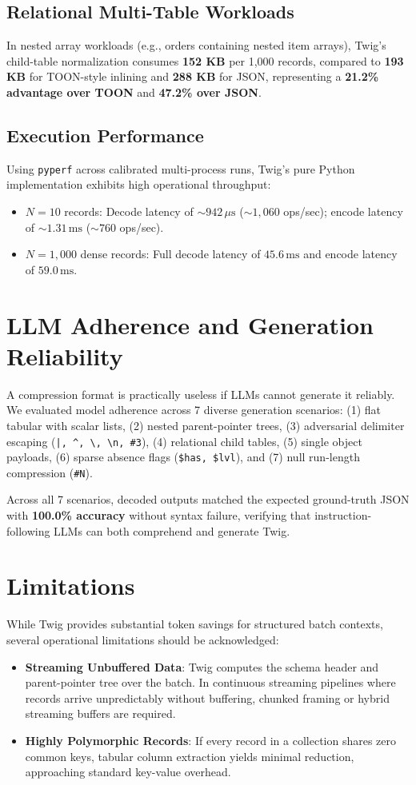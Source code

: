 \documentclass[11pt,a4paper]{article}
\begin{document}
\subsection{Relational Multi-Table Workloads}
In nested array workloads (e.g., orders containing nested item arrays), Twig's child-table normalization consumes \textbf{152 KB} per 1,000 records, compared to \textbf{193 KB} for TOON-style inlining and \textbf{288 KB} for JSON, representing a \textbf{21.2\% advantage over TOON} and \textbf{47.2\% over JSON}.

\subsection{Execution Performance}
Using \texttt{pyperf} across calibrated multi-process runs, Twig's pure Python implementation exhibits high operational throughput:
\begin{itemize}
    \item $N=10$ records: Decode latency of $\sim 942\,\mu\text{s}$ ($\sim 1,060$ ops/sec); encode latency of $\sim 1.31\,\text{ms}$ ($\sim 760$ ops/sec).
    \item $N=1,000$ dense records: Full decode latency of $45.6\,\text{ms}$ and encode latency of $59.0\,\text{ms}$.
\end{itemize}

\section{LLM Adherence and Generation Reliability}
A compression format is practically useless if LLMs cannot generate it reliably. We evaluated model adherence across 7 diverse generation scenarios: (1) flat tabular with scalar lists, (2) nested parent-pointer trees, (3) adversarial delimiter escaping (\texttt{|, \^{}, \textbackslash, \textbackslash n, \#3}), (4) relational child tables, (5) single object payloads, (6) sparse absence flags (\texttt{\$has, \$lvl}), and (7) null run-length compression (\texttt{\#N}).

Across all 7 scenarios, decoded outputs matched the expected ground-truth JSON with \textbf{100.0\% accuracy} without syntax failure, verifying that instruction-following LLMs can both comprehend and generate Twig.

\section{Limitations}
While Twig provides substantial token savings for structured batch contexts, several operational limitations should be acknowledged:
\begin{itemize}
    \item \textbf{Streaming Unbuffered Data}: Twig computes the schema header and parent-pointer tree over the batch. In continuous streaming pipelines where records arrive unpredictably without buffering, chunked framing or hybrid streaming buffers are required.
    \item \textbf{Highly Polymorphic Records}: If every record in a collection shares zero common keys, tabular column extraction yields minimal reduction, approaching standard key-value overhead.
\end{itemize}
\end{document}
